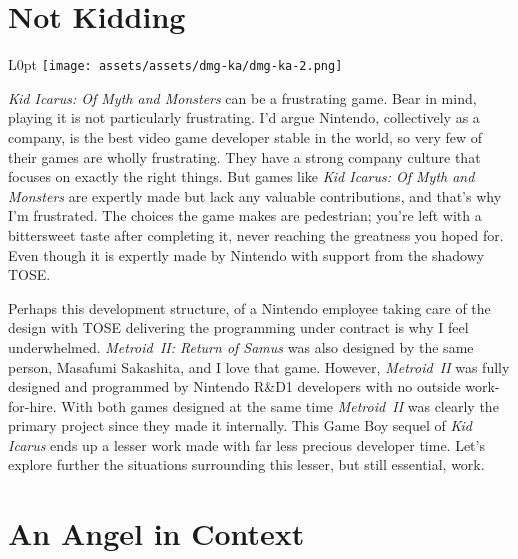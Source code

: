 \documentclass{book}
\begin{document}
\newpage\FloatBarrier\needspace{10mm}\section*{Not Kidding}\nopagebreak[4]
\begin{wrapfigure}{L}{0pt} \texttt{[image: assets/assets/dmg-ka/dmg-ka-2.png]}\end{wrapfigure}
\emph{Kid Icarus: Of Myth and Monsters} can be a frustrating game. Bear in mind, playing it is not particularly frustrating. I’d argue Nintendo, collectively as a company, is the best video game developer stable in the world, so very few of their games are wholly frustrating. They have a strong company culture that focuses on exactly the right things. But games like \emph{Kid Icarus: Of Myth and Monsters} are expertly made but lack any valuable contributions, and that’s why I’m frustrated. The choices the game makes are pedestrian; you’re left with a bittersweet taste after completing it, never reaching the greatness you hoped for. Even though it is expertly made by Nintendo with support from the shadowy TOSE.

Perhaps this development structure, of a Nintendo employee taking care of the design with TOSE delivering the programming under contract is why I feel underwhelmed. \emph{Metroid II: Return of Samus} was also designed by the same person, Masafumi Sakashita, and I love that game. However, \emph{Metroid II} was fully designed and programmed by Nintendo R\&D1 developers with no outside work-for-hire. With both games designed at the same time \emph{Metroid II} was clearly the primary project since they made it internally. This Game Boy sequel of \emph{Kid Icarus} ends up a lesser work made with far less precious developer time. Let’s explore further the situations surrounding this lesser, but still essential, work.

\FloatBarrier\needspace{10mm}\section*{An Angel in Context}\nopagebreak[4]
\end{document}
